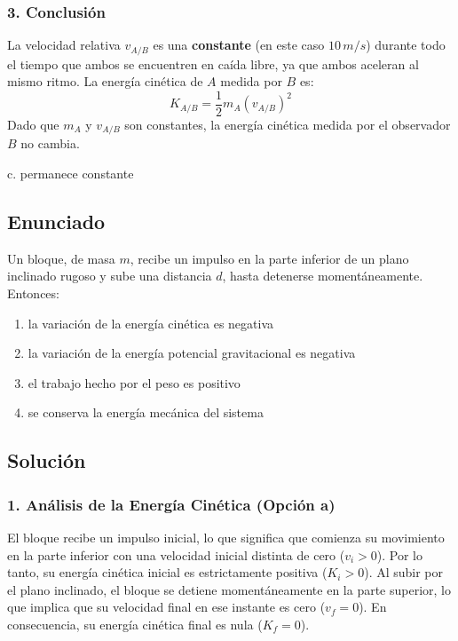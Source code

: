 \documentclass[12pt, a4paper]{article}
\begin{document}
\subsubsection*{3. Conclusión}
La velocidad relativa $v_{A/B}$ es una \textbf{constante} (en este caso $10 \, \si{m/s}$) durante todo el tiempo que ambos se encuentren en caída libre, ya que ambos aceleran al mismo ritmo.
La energía cinética de $A$ medida por $B$ es:
$$K_{A/B} = \frac{1}{2} m_A (v_{A/B})^2$$
Dado que $m_A$ y $v_{A/B}$ son constantes, la energía cinética medida por el observador $B$ no cambia.

\begin{tcolorbox}[colback=green!5!white, colframe=green!50!black, title=Respuesta Correcta]
\centering \Large c. permanece constante
\end{tcolorbox}

\newpage

\subsection*{Enunciado}
Un bloque, de masa $m$, recibe un impulso en la parte inferior de un plano inclinado rugoso y sube una distancia $d$, hasta detenerse momentáneamente. Entonces:
\begin{enumerate}[label=\alph*.]
    \item la variación de la energía cinética es negativa
    \item la variación de la energía potencial gravitacional es negativa
    \item el trabajo hecho por el peso es positivo
    \item se conserva la energía mecánica del sistema
\end{enumerate}

\subsection*{Solución}

\subsubsection*{1. Análisis de la Energía Cinética (Opción a)}
El bloque recibe un impulso inicial, lo que significa que comienza su movimiento en la parte inferior con una velocidad inicial distinta de cero ($v_i > 0$). Por lo tanto, su energía cinética inicial es estrictamente positiva ($K_i > 0$).
Al subir por el plano inclinado, el bloque se detiene momentáneamente en la parte superior, lo que implica que su velocidad final en ese instante es cero ($v_f = 0$). En consecuencia, su energía cinética final es nula ($K_f = 0$).
\end{document}
